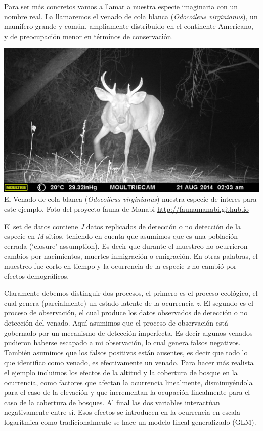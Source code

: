 \documentclass[
]{book}
\begin{document}
Para ser más concretos vamos a llamar a nuestra especie imaginaria con un nombre real. La llamaremos el venado de cola blanca (\emph{Odocoileus virginianus}), un mamífero grande y común, ampliamente distribuido en el continente Americano, y de preocupación menor en términos de \href{http://www.iucnredlist.org/details/42394}{conservación}.

\includegraphics{venado_large.jpg}
El Venado de cola blanca (\emph{Odocoileus virginianus}) nuestra especie de interes para este ejemplo. Foto del proyecto fauna de Manabi \url{http://faunamanabi.github.io}

El set de datos contiene \emph{J} datos replicados de detección o no detección de la especie en \emph{M} sitios, teniendo en cuenta que asumimos que es una población cerrada (`closure' assumption). Es decir que durante el muestreo no ocurrieron cambios por nacimientos, muertes inmigración o emigración. En otras palabras, el muestreo fue corto en tiempo y la ocurrencia de la especie \emph{z} no cambió por efectos demográficos.

Claramente debemos distinguir dos procesos, el primero es el proceso ecológico, el cual genera (parcialmente) un estado latente de la ocurrencia \emph{z}. El segundo es el proceso de observación, el cual produce los datos observados de detección o no detección del venado. Aquí asumimos que el proceso de observación está gobernado por un mecanismo de detección imperfecta. Es decir algunos venados pudieron haberse escapado a mi observación, lo cual genera falsos negativos. También asumimos que los falsos positivos están ausentes, es decir que todo lo que identifico como venado, es efectivamente un venado. Para hacer más realista el ejemplo incluimos los efectos de la altitud y la cobertura de bosque en la ocurrencia, como factores que afectan la ocurrencia linealmente, disminuyéndola para el caso de la elevación y que incrementan la ocupación linealmente para el caso de la cobertura de bosques. Al final las dos variables interactúan negativamente entre sí. Esos efectos se introducen en la ocurrencia en escala logarítmica como tradicionalmente se hace un modelo lineal generalizado (GLM).
\end{document}
